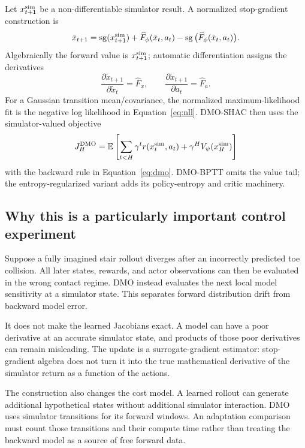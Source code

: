 Let $x_{t+1}^{\rm sim}$ be a non-differentiable simulator result. A normalized
stop-gradient construction is
\begin{equation}\label{eq:dmo}
\tilde x_{t+1}=\operatorname{sg}(x_{t+1}^{\rm sim})+
\widehat F_\phi(\tilde x_t,a_t)-\operatorname{sg}\big(\widehat F_\phi(\tilde x_t,a_t)\big).
\end{equation}
Algebraically the forward value is $x_{t+1}^{\rm sim}$; automatic differentiation
assigns the derivatives
\begin{equation}
\frac{\partial\tilde x_{t+1}}{\partial\tilde x_t}=\widehat F_x,
\qquad\frac{\partial\tilde x_{t+1}}{\partial a_t}=\widehat F_a.
\end{equation}
For a Gaussian transition mean/covariance, the normalized maximum-likelihood
fit is the negative log likelihood in Equation~\eqref{eq:nll}. DMO-SHAC then
uses the simulator-valued objective
\begin{equation}
J_H^{\rm DMO}=\mathbb E\left[\sum_{t<H}\gamma^t r(x_t^{\rm sim},a_t)
+\gamma^HV_\psi(x_H^{\rm sim})\right]
\end{equation}
with the backward rule in Equation~\eqref{eq:dmo}. DMO-BPTT omits the value tail;
the entropy-regularized variant adds its policy-entropy and critic machinery.

\subsection{Why this is a particularly important control experiment}
Suppose a fully imagined stair rollout diverges after an incorrectly predicted
toe collision. All later states, rewards, and actor observations can then be
evaluated in the wrong contact regime. DMO instead evaluates the next local
model sensitivity at a simulator state. This separates forward distribution
drift from backward model error.

It does not make the learned Jacobians exact. A model can have a poor derivative
at an accurate simulator state, and products of those poor derivatives can
remain misleading. The update is a surrogate-gradient estimator: stop-gradient
algebra does not turn it into the true mathematical derivative of the simulator
return as a function of the actions.

The construction also changes the cost model. A learned rollout can generate
additional hypothetical states without additional simulator interaction. DMO
uses simulator transitions for its forward windows. An adaptation comparison
must count those transitions and their compute time rather than treating the
backward model as a source of free forward data.

